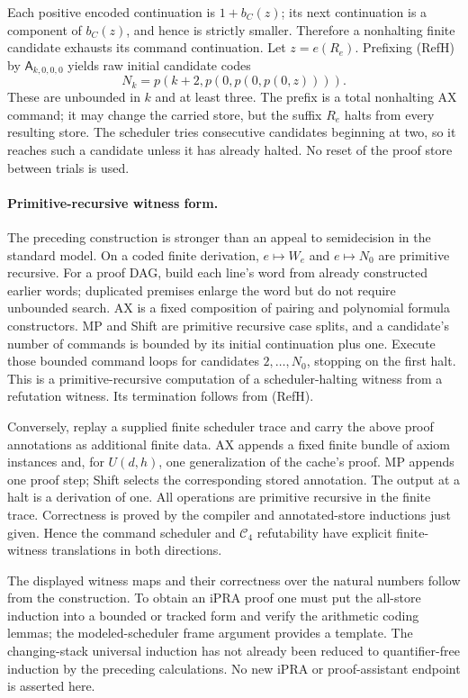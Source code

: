 Each positive encoded continuation is $1+b_C(z)$; its next continuation
is a component of $b_C(z)$, and hence is strictly smaller.  Therefore a
nonhalting finite candidate exhausts its command continuation.  Let
$z=e(R_e)$.  Prefixing (RefH) by $\mathsf A_{k,0,0,0}$ yields raw initial
candidate codes
\[
                 N_k=p(k+2,p(0,p(0,p(0,z)))).                  \tag{PadH}
\]
These are unbounded in $k$ and at least three.  The prefix is a total
nonhalting AX command; it may change the carried store, but the suffix
$R_e$ halts from every resulting store.  The scheduler tries consecutive
candidates beginning at two, so it reaches such a candidate unless it
has already halted.  No reset of the proof store between trials is used.

\paragraph{Primitive-recursive witness form.}
The preceding construction is stronger than an appeal to semidecision
in the standard model.  On a coded finite derivation, $e\mapsto W_e$ and
$e\mapsto N_0$ are primitive recursive.  For a proof DAG, build each line's
word from already constructed earlier words; duplicated premises enlarge
the word but do not require unbounded search.  AX is a fixed composition
of pairing and polynomial formula constructors.  MP and Shift are
primitive recursive case splits, and a candidate's number of commands
is bounded by its initial continuation plus one.  Execute those bounded
command loops for candidates $2,\ldots,N_0$, stopping on the first halt.
This is a primitive-recursive computation of a scheduler-halting witness
from a refutation witness.  Its termination follows from (RefH).

Conversely, replay a supplied finite scheduler trace and carry the above
proof annotations as additional finite data.  AX appends a fixed finite
bundle of axiom instances and, for $U(d,h)$, one generalization of the
cache's proof.  MP appends one proof step; Shift selects the corresponding
stored annotation.  The output at a halt is a derivation of one.  All
operations are primitive recursive in the finite trace.  Correctness is
proved by the compiler and annotated-store inductions just given.
Hence the command scheduler and $\mathcal C_4$ refutability have explicit
finite-witness translations in both directions.

The displayed witness maps and their correctness over the natural numbers
follow from the construction.  To obtain an iPRA proof one must put the
all-store induction into a bounded or tracked form and verify the arithmetic
coding lemmas; the modeled-scheduler frame argument provides a template.
The changing-stack universal induction has not already been reduced to
quantifier-free induction by the preceding calculations.  No new iPRA
or proof-assistant endpoint is asserted here.

